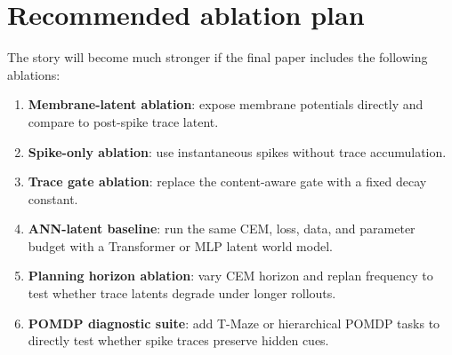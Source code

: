 \documentclass[10pt]{article}
\begin{document}
\section{Recommended ablation plan}

The story will become much stronger if the final paper includes the following ablations:
\begin{enumerate}[leftmargin=*]
    \item \textbf{Membrane-latent ablation}: expose membrane potentials directly and compare to post-spike trace latent.
    \item \textbf{Spike-only ablation}: use instantaneous spikes without trace accumulation.
    \item \textbf{Trace gate ablation}: replace the content-aware gate with a fixed decay constant.
    \item \textbf{ANN-latent baseline}: run the same CEM, loss, data, and parameter budget with a Transformer or MLP latent world model.
    \item \textbf{Planning horizon ablation}: vary CEM horizon and replan frequency to test whether trace latents degrade under longer rollouts.
    \item \textbf{POMDP diagnostic suite}: add T-Maze or hierarchical POMDP tasks to directly test whether spike traces preserve hidden cues.
\end{enumerate}
\end{document}
